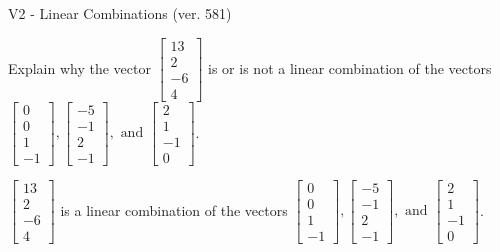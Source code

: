 \begin{exercise}
  \begin{exerciseTitle}V2 - Linear Combinations (ver. 581)\end{exerciseTitle}
  \begin{exerciseStatement}
    Explain why the vector \(\left[\begin{array}{c}
13 \\
2 \\
-6 \\
4
\end{array}\right]\)  is or is not a linear 
	combination of the vectors \(\left[\begin{array}{c}
0 \\
0 \\
1 \\
-1
\end{array}\right] , \left[\begin{array}{c}
-5 \\
-1 \\
2 \\
-1
\end{array}\right] , \text{ and } \left[\begin{array}{c}
2 \\
1 \\
-1 \\
0
\end{array}\right]\).
	


  \end{exerciseStatement}
  \begin{exerciseAnswer}
   \(\left[\begin{array}{c}
13 \\
2 \\
-6 \\
4
\end{array}\right]\) 
  	 is  
	a linear combination of the vectors \(\left[\begin{array}{c}
0 \\
0 \\
1 \\
-1
\end{array}\right] , \left[\begin{array}{c}
-5 \\
-1 \\
2 \\
-1
\end{array}\right] , \text{ and } \left[\begin{array}{c}
2 \\
1 \\
-1 \\
0
\end{array}\right]\).

	
  


  \end{exerciseAnswer}
\end{exercise}
